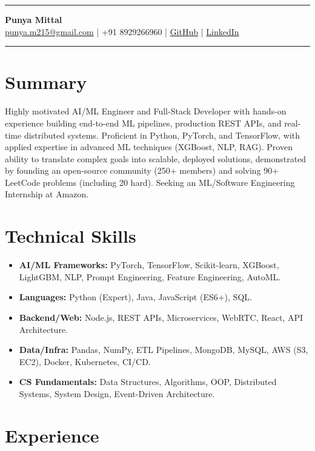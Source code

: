 \documentclass[10pt, letterpaper]{article}
\makeatletter
\newcommand{\contactinfo}[1]{
    \centering
    \vspace{-10pt}
    \hrule
    \vspace{2pt}
    \textbf{\Large #1} \\
    \vspace{2pt}
    \small \href{mailto:punya.m215@gmail.com}{punya.m215@gmail.com} | +91 8929266960 | 
    \href{https://github.com/PunyaMittal}{GitHub} | \href{https://linkedin.com/in/punya-mittal-a1122520b}{LinkedIn}
    \vspace{4pt}
    \hrule
}
\makeatother
\begin{document}
\contactinfo{Punya Mittal}

\section*{Summary}
Highly motivated AI/ML Engineer and Full-Stack Developer with hands-on experience building end-to-end ML pipelines, production REST APIs, and real-time distributed systems. Proficient in Python, PyTorch, and TensorFlow, with applied expertise in advanced ML techniques (XGBoost, NLP, RAG). Proven ability to translate complex goals into scalable, deployed solutions, demonstrated by founding an open-source community (250+ members) and solving 90+ LeetCode problems (including 20 hard). Seeking an ML/Software Engineering Internship at Amazon.

\section*{Technical Skills}
\begin{itemize}[leftmargin=*, itemsep=0pt, parsep=0pt]
    \item \textbf{AI/ML Frameworks:} PyTorch, TensorFlow, Scikit-learn, XGBoost, LightGBM, NLP, Prompt Engineering, Feature Engineering, AutoML.
    \item \textbf{Languages:} Python (Expert), Java, JavaScript (ES6+), SQL.
    \item \textbf{Backend/Web:} Node.js, REST APIs, Microservices, WebRTC, React, API Architecture.
    \item \textbf{Data/Infra:} Pandas, NumPy, ETL Pipelines, MongoDB, MySQL, AWS (S3, EC2), Docker, Kubernetes, CI/CD.
    \item \textbf{CS Fundamentals:} Data Structures, Algorithms, OOP, Distributed Systems, System Design, Event-Driven Architecture.
\end{itemize}

\section*{Experience}
\end{document}
